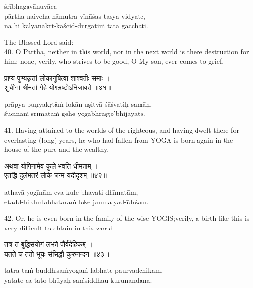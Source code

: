 \begin{transliteration}
śrībhagavānuvāca \\
pārtha naiveha nāmutra vīnāśas-tasya vidyate, \\
na hi kalyāṇakṛt-kaścid-durgatiṁ tāta gacchati.
\end{transliteration}

The Blessed Lord said: \\
40. O Partha, neither in this world, nor in the next world is there destruction
for him; none, verily, who strives to be good, O My son, ever comes to grief.

\begin{gitaverse}
प्राप्य पुण्यकृतां लोकानुषित्वा शाश्वतीः समाः । \\
शुचीनां श्रीमतां गेहे योगभ्रष्टोऽभिजायते ॥४१॥
\end{gitaverse}

\begin{transliteration}
prāpya puṇyakṛtāṁ lokān-uṣitvā śāśvatiḥ samāḥ, \\
śucīnāṁ srīmatāṁ gehe yogabhraṣṭo'bhijāyate.
\end{transliteration}

41. Having attained to the worlds of the righteous, and having dwelt there for
everlasting (long) years, he who had fallen from YOGA is born again in the
house of the pure and the wealthy.

\begin{gitaverse}
अथवा योगिनामेव कुले भवति धीमताम् । \\
एतद्धि दुर्लभतरं लोके जन्म यदीदृशम् ॥४२॥
\end{gitaverse}

\begin{transliteration}
athavā yogīnām-eva kule bhavati dhīmatām, \\
etadd-hi durlabhataraṁ loke janma yad-īdrśam.
\end{transliteration}

42. Or, he is even born in the family of the wise YOGIS;\@ verily, a birth like
this is very difficult to obtain in this world.

\begin{gitaverse}
तत्र तं बुद्धिसंयोगं लभते पौर्वदेहिकम् । \\
यतते च ततो भूयः संसिद्धौ कुरुनन्दन ॥४३॥
\end{gitaverse}

\begin{transliteration}
tatra taṁ buddhisaṁyogaṁ labhate paurvadehikam, \\
yatate ca tato bhūyaḥ saṁsiddhau kurunandana.
\end{transliteration}

